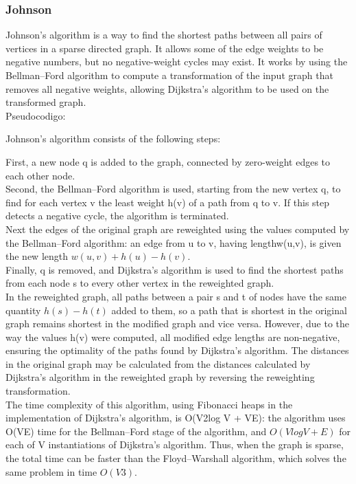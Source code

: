 \documentclass[10pt,letterpaper,twocolumn,twosided]{article}
\begin{document}
\subsubsection{Johnson}

Johnson's algorithm is a way to find the shortest paths between all pairs of vertices in a
sparse directed graph. It allows some of the edge weights to be negative numbers, but no 
negative-weight cycles may exist. It works by using the Bellman–Ford algorithm to compute a
transformation of the input graph that removes all negative weights, allowing Dijkstra's algorithm 
to be used on the transformed graph.\\

Pseudocodigo:

Johnson's algorithm consists of the following steps:

First, a new node q is added to the graph, connected by zero-weight edges to each other node.\\

Second, the Bellman–Ford algorithm is used, starting from the new vertex q, to find for each vertex v the 
least weight h(v) of a path from q to v. If this step detects a negative cycle, the algorithm is terminated.\\

Next the edges of the original graph are reweighted using the values computed by the Bellman–Ford algorithm: 
an edge from u to v, having lengthw(u,v), is given the new length $ w(u,v) + h(u) - h(v).$\\

Finally, q is removed, and Dijkstra's algorithm is used to find the shortest paths from each node s to every
other vertex in the reweighted graph.\\

In the reweighted graph, all paths between a pair s and t of nodes have the same quantity $h(s) - h(t)$ added to
them, so a path that is shortest in the original graph remains shortest in the modified graph and vice versa.
However, due to the way the values h(v) were computed, all modified edge lengths are non-negative, ensuring the
optimality of the paths found by Dijkstra's algorithm. The distances in the original graph may be calculated from 
the distances calculated by Dijkstra's algorithm in the reweighted graph by reversing the reweighting transformation.\\

The time complexity of this algorithm, using Fibonacci heaps in the implementation of Dijkstra's algorithm, 
is O(V2log V + VE): the algorithm uses O(VE) time for the Bellman–Ford stage of the algorithm, and $O(V log V + E)$
for each of V instantiations of Dijkstra's algorithm. Thus, when the graph is sparse, the total time can be faster
than the Floyd–Warshall algorithm, which solves the same problem in time $ O(V3).$\\
\end{document}
